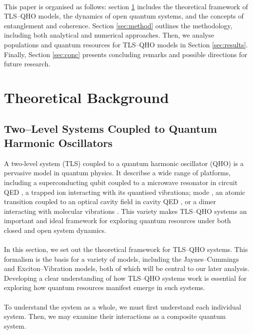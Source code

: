 \documentclass[11pt]{article}
\begin{document}
\\
This paper is organised as follows: section \ref{sec:theory} includes the theoretical framework of TLS--QHO models, the dynamics of open quantum systems, and the concepts of entanglement and coherence. Section \ref{sec:method} outlines the methodology, including both analytical and numerical approaches. Then, we analyse populations and quantum resources for TLS--QHO models in Section \ref{sec:results}. Finally, Section  \ref{sec:conc} presents concluding remarks and possible directions for future research.


\newpage

\section{Theoretical Background} \label{sec:theory}



\subsection{Two--Level Systems Coupled to Quantum Harmonic Oscillators} \label{sec:theory_sub_TLSQHO}

A two-level system (TLS) coupled to a quantum harmonic oscillator (QHO) is a pervasive model in quantum physics. It describse a wide range of platforms, including a superconducting qubit coupled to a microwave resonator in circuit QED \cite{Context2024-CircuitQED}, a trapped ion interacting with its quantised vibrationa; mode \cite{Context1992-Trapped_ions}, an atomic transition coupled to an optical cavity field in cavity QED \cite{Context2024-CQED_JCM}, or a dimer interacting with molecular vibrations \cite{ExVib2014-Alexandra}. This variety makes TLS–QHO systems an important and ideal framework for exploring quantum resources under both closed and open system dynamics.\\
\\
In this section, we set out the theoretical framework for TLS--QHO systems. This formalism is the basis for a variety of models, including the Jaynes--Cummings and Exciton--Vibration models, both of which will be central to our later analysis. Developing a clear understanding of how TLS--QHO systems work is essential for exploring how quantum resources manifest emerge in such systems. \\
\\
To understand the system as a whole, we must first understand each individual system. Then, we may examine their interactions as a composite quantum system.
\end{document}
